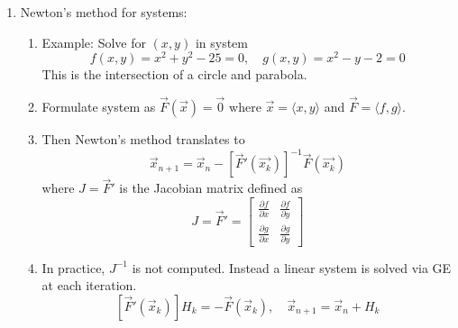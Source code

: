 \documentclass{article}
\theoremstyle{remark}
\begin{document}
\begin{enumerate}
\item Newton's method for systems:
\begin{enumerate}
\item Example: Solve for $(x,y)$ in system
\[
f(x,y)=x^2+y^2-25=0, \quad g(x,y)=x^2-y-2=0
\]
This is the intersection of a circle and parabola.
\item Formulate system as $\vec{F}(\vec{x})=\vec{0}$ where $\vec{x}=\langle x,y \rangle$ and $\vec{F} = \langle f, g \rangle$. 
\item Then Newton's method translates to 
\[
\vec{x}_{n+1} = \vec{x}_n - [\vec{F}'(\vec{x_k})]^{-1} \vec{F}(\vec{x_k})
\]
where $J= \vec{F}'$ is the Jacobian matrix defined as
\[
J = \vec{F}' = \left[
\begin{array}{cc}
\frac{\partial f}{\partial x} & \frac{\partial f}{\partial y} \\
\frac{\partial g}{\partial x} & \frac{\partial g}{\partial y} 
\end{array} \right]
\]
\item In practice, $J^{-1}$ is not computed. Instead a linear system is solved via GE at each iteration.
\[
[\vec{F}'(\vec{x}_k) ] H_k = -\vec{F}(\vec{x}_k), \quad 
\vec{x}_{n+1} = \vec{x}_n + H_{k}
\]
\end{enumerate}


\end{enumerate}
\end{document}
